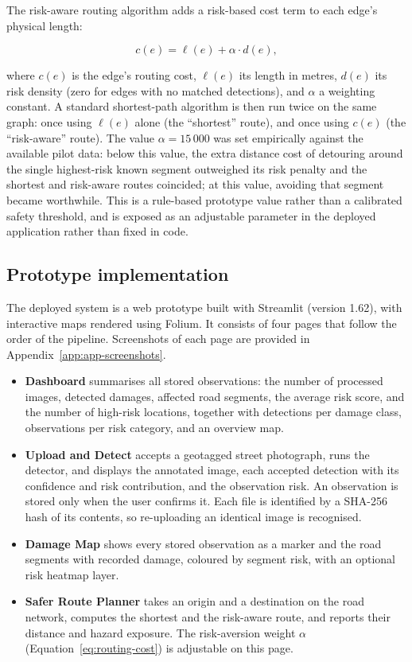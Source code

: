 \documentclass[10pt,a4paper,twocolumn]{article}
\begin{document}
The risk-aware routing algorithm adds a risk-based cost term to each
edge's physical length:

\begin{equation}
  \label{eq:routing-cost}
  c(e) = \ell(e) + \alpha \cdot d(e),
\end{equation}

where $c(e)$ is the edge's routing cost, $\ell(e)$ its length in metres,
$d(e)$ its risk density (zero for edges with no matched detections), and
$\alpha$ a weighting constant. A standard shortest-path algorithm is then
run twice on the same graph: once using $\ell(e)$ alone (the
``shortest'' route), and once using $c(e)$ (the ``risk-aware'' route).
The value $\alpha = 15\,000$ was set empirically against the available
pilot data: below this value, the extra distance cost of detouring
around the single highest-risk known segment outweighed its risk penalty
and the shortest and risk-aware routes coincided; at this value, avoiding
that segment became worthwhile. This is a rule-based prototype value
rather than a calibrated safety threshold, and is exposed as an
adjustable parameter in the deployed application rather than fixed in
code.

\subsection{Prototype implementation}
\label{sec:method-prototype}

The deployed system is a web prototype built with Streamlit (version
1.62), with interactive maps rendered using Folium. It consists of four
pages that follow the order of the pipeline. Screenshots of each page are
provided in Appendix~\ref{app:app-screenshots}.

\begin{itemize}
  \item \textbf{Dashboard} summarises all stored observations: the number
  of processed images, detected damages, affected road segments, the
  average risk score, and the number of high-risk locations, together with
  detections per damage class, observations per risk category, and an
  overview map.
  \item \textbf{Upload and Detect} accepts a geotagged street photograph,
  runs the detector, and displays the annotated image, each accepted
  detection with its confidence and risk contribution, and the observation
  risk. An observation is stored only when the user confirms it. Each
  file is identified by a SHA-256 hash of its contents, so re-uploading an
  identical image is recognised.
  \item \textbf{Damage Map} shows every stored observation as a marker and
  the road segments with recorded damage, coloured by segment risk, with an
  optional risk heatmap layer.
  \item \textbf{Safer Route Planner} takes an origin and a destination on
  the road network, computes the shortest and the risk-aware route, and
  reports their distance and hazard exposure. The risk-aversion weight
  $\alpha$ (Equation~\ref{eq:routing-cost}) is adjustable on this page.
\end{itemize}
\end{document}
